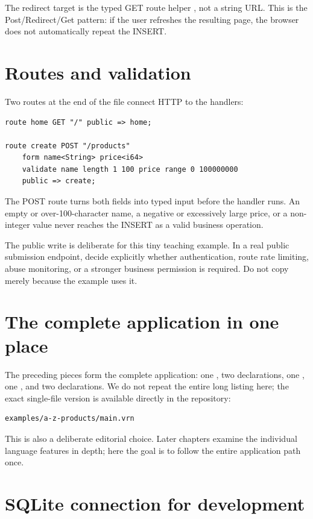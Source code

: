 The redirect target is the typed GET route helper , not a string URL. This is the Post/Redirect/Get pattern: if the user refreshes the resulting page, the browser does not automatically repeat the INSERT.

\section{Routes and validation}

Two routes at the end of the file connect HTTP to the handlers:

\begin{lstlisting}[language=Velran]
route home GET "/" public => home;

route create POST "/products"
    form name<String> price<i64>
    validate name length 1 100 price range 0 100000000
    public => create;
\end{lstlisting}

The POST route turns both fields into typed input before the handler runs. An empty or over-100-character name, a negative or excessively large price, or a non-integer value never reaches the INSERT as a valid business operation.

The public write is deliberate for this tiny teaching example. In a real public submission endpoint, decide explicitly whether authentication, route rate limiting, abuse monitoring, or a stronger business permission is required. Do not copy  merely because the example uses it.

\section{The complete application in one place}

The preceding pieces form the complete application: one , two  declarations, one , one , and two  declarations. We do not repeat the entire long listing here; the exact single-file version is available directly in the repository:

\begin{lstlisting}
examples/a-z-products/main.vrn
\end{lstlisting}

This is also a deliberate editorial choice. Later chapters examine the individual language features in depth; here the goal is to follow the entire application path once.

\section{SQLite connection for development}

